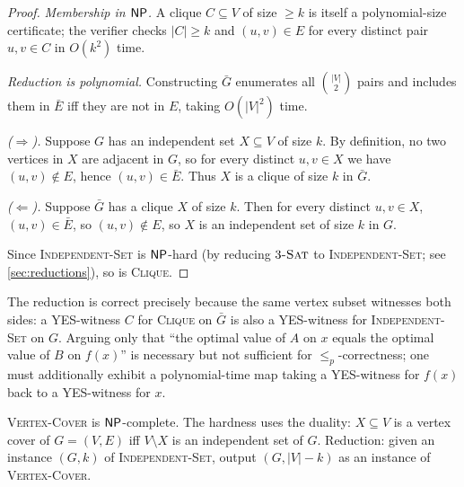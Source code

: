 \begin{proof}
\textit{Membership in $\mathsf{NP}$.} A clique $C \subseteq V$ of size $\ge k$ is itself a polynomial-size certificate; the verifier checks $|C| \ge k$ and $(u, v) \in E$ for every distinct pair $u, v \in C$ in $O(k^2)$ time.

\medskip
\noindent\textit{Reduction is polynomial.} Constructing $\bar G$ enumerates all $\binom{|V|}{2}$ pairs and includes them in $\bar E$ iff they are not in $E$, taking $O(|V|^2)$ time.

\medskip
\noindent\textit{($\Rightarrow$).} Suppose $G$ has an independent set $X \subseteq V$ of size $k$. By definition, no two vertices in $X$ are adjacent in $G$, so for every distinct $u, v \in X$ we have $(u, v) \notin E$, hence $(u, v) \in \bar E$. Thus $X$ is a clique of size $k$ in $\bar G$.

\medskip
\noindent\textit{($\Leftarrow$).} Suppose $\bar G$ has a clique $X$ of size $k$. Then for every distinct $u, v \in X$, $(u, v) \in \bar E$, so $(u, v) \notin E$, so $X$ is an independent set of size $k$ in $G$.

\medskip
Since \textsc{Independent-Set} is $\mathsf{NP}$-hard (by reducing $3\textsc{-Sat}$ to \textsc{Independent-Set}; see \cref{sec:reductions}), so is \textsc{Clique}.
\end{proof}

\begin{remark}
The reduction is correct precisely because the same vertex subset witnesses both sides: a YES-witness $C$ for \textsc{Clique} on $\bar G$ is also a YES-witness for \textsc{Independent-Set} on $G$. Arguing only that ``the optimal value of $A$ on $x$ equals the optimal value of $B$ on $f(x)$'' is necessary but not sufficient for $\le_p$-correctness; one must additionally exhibit a polynomial-time map taking a YES-witness for $f(x)$ back to a YES-witness for $x$.
\end{remark}

\begin{theorem}
\label{thm:is_to_vc}
\textsc{Vertex-Cover} is $\mathsf{NP}$-complete. The hardness uses the duality: $X \subseteq V$ is a vertex cover of $G = (V, E)$ iff $V \setminus X$ is an independent set of $G$. Reduction: given an instance $(G, k)$ of \textsc{Independent-Set}, output $(G, |V| - k)$ as an instance of \textsc{Vertex-Cover}.
\end{theorem}


